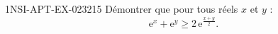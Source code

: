 \begin{exercice}{1NSI-APT-EX-023}{2}{15}
Démontrer que pour tous réels $x$ et $y$ :
\[ \mathrm{e}^x + \mathrm{e}^y \geq 2\,\mathrm{e}^{\frac{x+y}{2}}. \]

\end{exercice}
